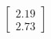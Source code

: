\documentclass[preview]{standalone}
\begin{document}
\begin{align*}
\begin{bmatrix} 2.19 \\ 2.73 \end{bmatrix}
\end{align*}
\end{document}
